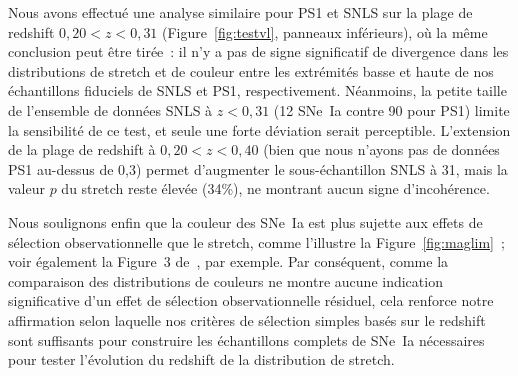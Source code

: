 \documentclass[../main/main.tex]{subfiles}
\begin{document}
Nous avons effectué une analyse similaire pour PS1 et SNLS sur la plage de
redshift $0,20 < z < 0,31$ (Figure~\ref{fig:testvl}, panneaux inférieurs), où la
même conclusion peut être tirée~: il n'y a pas de signe significatif de
divergence dans les distributions de stretch et de couleur entre les extrémités
basse et haute de nos échantillons fiduciels de SNLS et PS1, respectivement.
Néanmoins, la petite taille de l'ensemble de données SNLS à $z < 0,31$ (12
SNe~Ia contre 90 pour PS1) limite la sensibilité de ce test, et seule une forte
déviation serait perceptible. L'extension de la plage de redshift à $0,20 < z <
0,40$ (bien que nous n'ayons pas de données PS1 au-dessus de 0,3) permet
d'augmenter le sous-échantillon SNLS à 31, mais la valeur $p$ du stretch reste
élevée (34\%), ne montrant aucun signe d'incohérence.

Nous soulignons enfin que la couleur des SNe~Ia est plus sujette aux effets de
sélection observationnelle que le stretch, comme l'illustre la
Figure~\ref{fig:maglim}~; voir également la Figure~3 de~\cite{kessler2017}, par
exemple. Par conséquent, comme la comparaison des distributions de couleurs ne
montre aucune indication significative d'un effet de sélection observationnelle
résiduel, cela renforce notre affirmation selon laquelle nos critères de
sélection simples basés sur le redshift sont suffisants pour construire les
échantillons complets de SNe~Ia nécessaires pour tester l'évolution du redshift
de la distribution de stretch.

\newpage

\minilof
\minilot


\shorthandoff{:}

\end{document}
